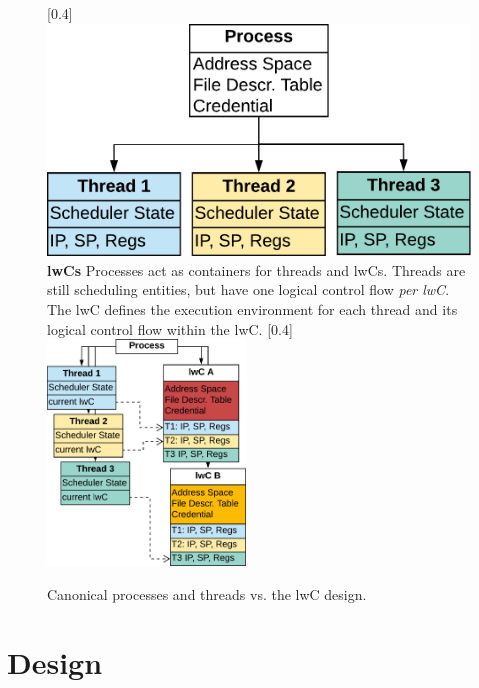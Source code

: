 \documentclass[10pt,twocolumn,a4paper]{article}
\begin{document}
\begin{figure}[t]
  \centering
  [0.4\linewidth]
  {
    \includegraphics[width=\linewidth]{fig/canonical-proc-thread-relationship}
  }
  \hspace{1cm}
  \subcaptionbox
  {
      \textbf{lwCs}\hspace{1em}
      Processes act as containers for threads and lwCs.
      Threads are still scheduling entities, but have one logical control flow \textit{per lwC}.
      The lwC defines the execution environment for each thread and its logical control flow within the lwC.
    \label{design:fig:lwcprocthreadrelationship}
  }
  [0.4\linewidth]
  {
    \includegraphics[height=6cm]{fig/lwc-proc-thread-relationship}
  }
  \caption{Canonical processes and threads vs. the lwC design.}
\end{figure}


\section{Design}\label{design}
\end{document}
